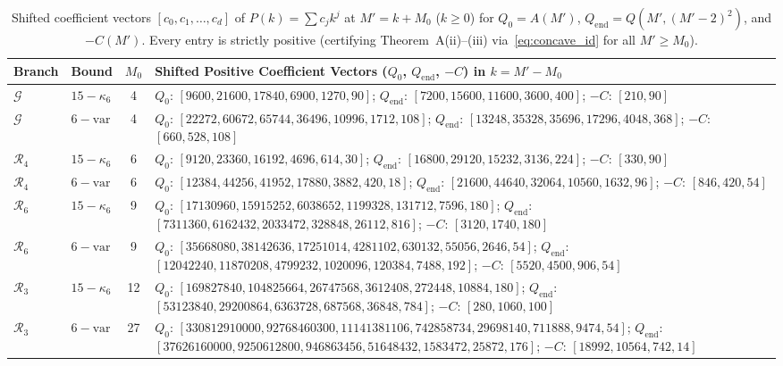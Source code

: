 \documentclass[11pt,a4paper]{article}
\theoremstyle{remark}
\begin{document}
\begin{table}[ht]
\centering
\caption{Shifted coefficient vectors $[c_0, c_1, \dots, c_d]$ of $P(k) = \sum c_j k^j$ at $M' = k + M_0$ ($k \ge 0$) for $Q_0 = A(M')$, $Q_{\mathrm{end}} = Q(M', (M'-2)^2)$, and $-C(M')$. Every entry is strictly positive (certifying Theorem~A(ii)--(iii) via~\eqref{eq:concave_id} for all $M' \ge M_0$).}
\label{tab:mu6_shifted}
\scriptsize
\setlength{\tabcolsep}{3pt}
\begin{tabular}{@{}llc>{\raggedright\arraybackslash}p{11.0cm}@{}}
\toprule
Branch & Bound & $M_0$ & Shifted Positive Coefficient Vectors ($Q_0$, $Q_{\mathrm{end}}$, $-C$) in $k = M' - M_0$ \\
\midrule
$\mathcal{G}$ & $15{-}\kappa_6$ & 4 & $Q_0$: $[9600, 21600, 17840, 6900, 1270, 90]$;\; $Q_{\mathrm{end}}$: $[7200, 15600, 11600, 3600, 400]$;\; $-C$: $[210, 90]$ \\
$\mathcal{G}$ & $6{-}\mathrm{var}$ & 4 & $Q_0$: $[22272, 60672, 65744, 36496, 10996, 1712, 108]$;\; $Q_{\mathrm{end}}$: $[13248, 35328, 35696, 17296, 4048, 368]$;\; $-C$: $[660, 528, 108]$ \\
\midrule
$\mathcal{R}_4$ & $15{-}\kappa_6$ & 6 & $Q_0$: $[9120, 23360, 16192, 4696, 614, 30]$;\; $Q_{\mathrm{end}}$: $[16800, 29120, 15232, 3136, 224]$;\; $-C$: $[330, 90]$ \\
$\mathcal{R}_4$ & $6{-}\mathrm{var}$ & 6 & $Q_0$: $[12384, 44256, 41952, 17880, 3882, 420, 18]$;\; $Q_{\mathrm{end}}$: $[21600, 44640, 32064, 10560, 1632, 96]$;\; $-C$: $[846, 420, 54]$ \\
\midrule
$\mathcal{R}_6$ & $15{-}\kappa_6$ & 9 & $Q_0$: $[17130960, 15915252, 6038652, 1199328, 131712, 7596, 180]$;\; $Q_{\mathrm{end}}$: $[7311360, 6162432, 2033472, 328848, 26112, 816]$;\; $-C$: $[3120, 1740, 180]$ \\
$\mathcal{R}_6$ & $6{-}\mathrm{var}$ & 9 & $Q_0$: $[35668080, 38142636, 17251014, 4281102, 630132, 55056, 2646, 54]$;\; $Q_{\mathrm{end}}$: $[12042240, 11870208, 4799232, 1020096, 120384, 7488, 192]$;\; $-C$: $[5520, 4500, 906, 54]$ \\
\midrule
$\mathcal{R}_3$ & $15{-}\kappa_6$ & 12 & $Q_0$: $[169827840, 104825664, 26747568, 3612408, 272448, 10884, 180]$;\; $Q_{\mathrm{end}}$: $[53123840, 29200864, 6363728, 687568, 36848, 784]$;\; $-C$: $[280, 1060, 100]$ \\
$\mathcal{R}_3$ & $6{-}\mathrm{var}$ & 27 & $Q_0$: $[330812910000, 92768460300, 11141381106, 742858734, 29698140, 711888, 9474, 54]$;\; $Q_{\mathrm{end}}$: $[37626160000, 9250612800, 946863456, 51648432, 1583472, 25872, 176]$;\; $-C$: $[18992, 10564, 742, 14]$ \\
\bottomrule
\end{tabular}
\end{table}
\end{document}
